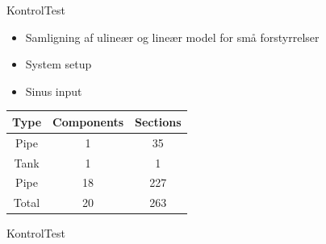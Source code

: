 \begin{frame}{Kontrol}{Test}
   \vfill\vfill\centering
    \begin{minipage}[t]{0.48\linewidth}
\begin{itemize}
		\item Samligning af ulineær og lineær model for små forstyrrelser
		\item System setup
	   	\item Sinus input
\end{itemize}    
\end{minipage}\hfill
\begin{minipage}[t]{0.48\linewidth}
\begin{table}[H]
\centering
\begin{tabular}{|c|c|c|}
\hline
	\rowcolor[HTML]{9B9B9B} 
Type  & Components & Sections \\ \hline
Pipe  & 1         & 35       \\ \hline
Tank  & 1         & 1        \\ \hline
Pipe  & 18        & 227      \\ \hline
Total & 20        & 263      \\ \hline
\end{tabular}
\label{tab:system_setup_nonlinear_linear_test}
\end{table}

\end{minipage}
\vfill\vfill

\end{frame}

\begin{frame}{Kontrol}{Test}
\vfill \vfill \centering
% 
\vspace{-5mm}
\begin{figure}
\centering

\label{fig:linear_nonlinear_comparison_tank_height}
\end{figure}

    \vspace{-9mm}
\begin{figure}
\centering

\label{fig:linear_nonlinear_comparison_last_pipe}
\end{figure}
\vspace{5mm}
\vfill \vfill
\end{frame}

